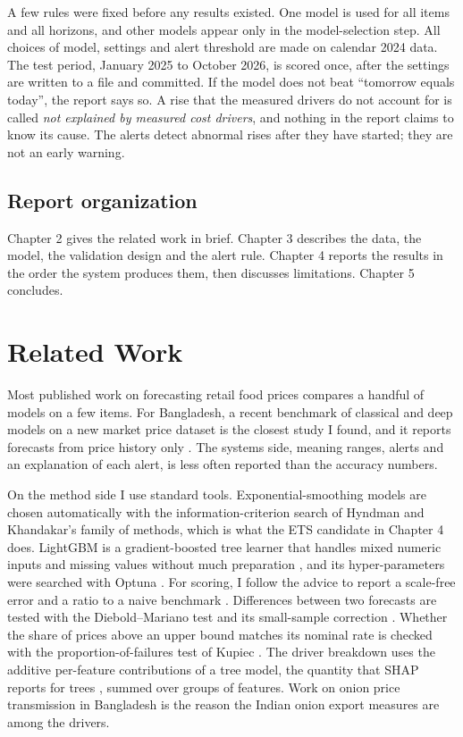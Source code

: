 \documentclass[12pt]{report}
\newcommand{\unexpl}{\emph{not explained by measured cost drivers}}
\begin{document}
A few rules were fixed before any results existed. One model is used for all items and all horizons, and other models appear only in the model-selection step. All choices of model, settings and alert threshold are made on calendar 2024 data. The test period, January 2025 to October 2026, is scored once, after the settings are written to a file and committed. If the model does not beat ``tomorrow equals today'', the report says so. A rise that the measured drivers do not account for is called \unexpl, and nothing in the report claims to know its cause. The alerts detect abnormal rises after they have started; they are not an early warning.

\section{Report organization}
Chapter 2 gives the related work in brief. Chapter 3 describes the data, the model, the validation design and the alert rule. Chapter 4 reports the results in the order the system produces them, then discusses limitations. Chapter 5 concludes.

\chapter{Related Work}
Most published work on forecasting retail food prices compares a handful of models on a few items. For Bangladesh, a recent benchmark of classical and deep models on a new market price dataset is the closest study I found, and it reports forecasts from price history only \cite{agripricebd}. The systems side, meaning ranges, alerts and an explanation of each alert, is less often reported than the accuracy numbers.

On the method side I use standard tools. Exponential-smoothing models are chosen automatically with the information-criterion search of Hyndman and Khandakar's family of methods, which is what the ETS candidate in Chapter 4 does. LightGBM is a gradient-boosted tree learner that handles mixed numeric inputs and missing values without much preparation \cite{lightgbm}, and its hyper-parameters were searched with Optuna \cite{optuna}. For scoring, I follow the advice to report a scale-free error and a ratio to a naive benchmark \cite{hk2006}. Differences between two forecasts are tested with the Diebold--Mariano test and its small-sample correction \cite{dm1995,hln1997}. Whether the share of prices above an upper bound matches its nominal rate is checked with the proportion-of-failures test of Kupiec \cite{kupiec}. The driver breakdown uses the additive per-feature contributions of a tree model, the quantity that SHAP reports for trees \cite{shap}, summed over groups of features. Work on onion price transmission in Bangladesh \cite{onionnardl} is the reason the Indian onion export measures are among the drivers.
\end{document}
